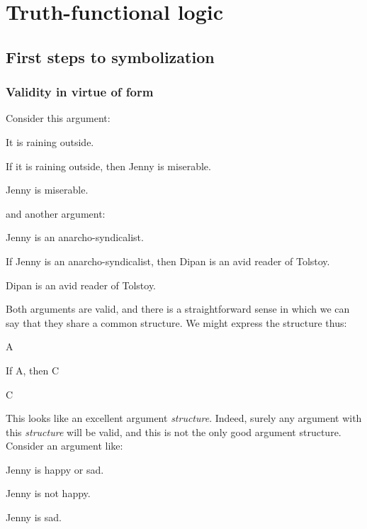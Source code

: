 \part{Truth-functional logic}
\label{ch.TFL}

\chapter{First steps to symbolization}

\section{Validity in virtue of form}\label{s:ValidityInVirtueOfForm}
Consider this argument:
	\begin{earg}
		\item[] It is raining outside.
		\item[] If it is raining outside, then Jenny is miserable.
		\item[\therefore] Jenny is miserable.
	\end{earg}
and another argument:
	\begin{earg}
		\item[] Jenny is an anarcho-syndicalist.
		\item[] If Jenny is an anarcho-syndicalist, then Dipan is an avid reader of Tolstoy.
		\item[\therefore] Dipan is an avid reader of Tolstoy.
	\end{earg}
Both arguments are valid, and there is a straightforward sense in which we can say that they share a common structure. We might express the structure thus:
	\begin{earg}
		\item[] A
		\item[] If A, then C
		\item[\therefore] C
	\end{earg}
This looks like an excellent argument \emph{structure}. Indeed, surely any argument with this \emph{structure} will be valid, and this is not the only good argument structure. Consider an argument like:
	\begin{earg}
		\item[] Jenny is  happy or sad.
		\item[] Jenny is not happy.
		\item[\therefore] Jenny is sad.
	\end{earg}
